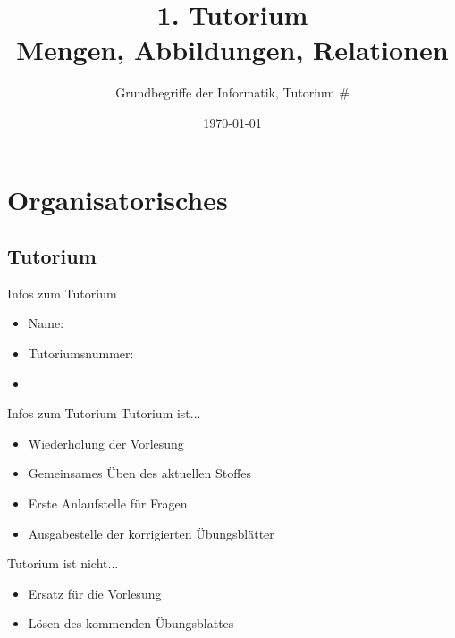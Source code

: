 




\title[Mengen, Abbildungen, Relationen]{1. Tutorium\\ Mengen, Abbildungen, Relationen}
\subtitle{Grundbegriffe der Informatik, Tutorium \#\mytutnumber}
\date{\today}


\titleframe
\roadmap

\section{Organisatorisches}
\subsection{Tutorium}

	\aboutMeFrame

	\ifdefined \Moritz 
	\fi

	\begin{frame}{Infos zum Tutorium}
		\begin{itemize}
			\item Name: \myname
			\item Tutoriumsnummer: \mytutnumber
			\item \mytutinfos
		\end{itemize}	
	\end{frame}

	\begin{frame}{Infos zum Tutorium}
		Tutorium ist...\\
		\begin{itemize}
			\item Wiederholung der Vorlesung
			\item Gemeinsames Üben des aktuellen Stoffes
			\item Erste Anlaufstelle für Fragen
			\item Ausgabestelle der korrigierten Übungsblätter
		\end{itemize}
		\pause
		Tutorium ist nicht...\\
		\begin{itemize}
			\item Ersatz für die Vorlesung
			\item Lösen des kommenden Übungsblattes
		\end{itemize}
	\end{frame}
	
